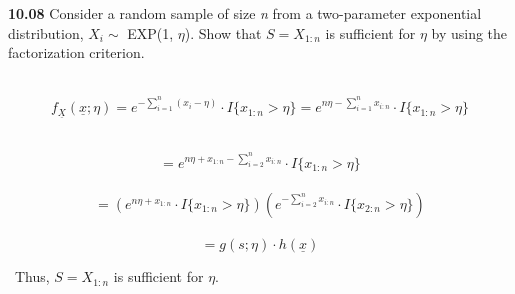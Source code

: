 { \bf 10.08 } Consider a random sample of size \textsl{n} from a two-parameter exponential distribution, $ X_{i} \sim $ EXP(1, $ \eta $).  Show that $ S = X_{1:n} $ is sufficient for $ \eta $ by using the factorization criterion.

\ $$ f_{\underline{X}}(\underline{x}; \eta) = e^{-\sum_{i=1}^{n}(x_{i}-\eta)} \cdot I \{x_{1:n} > \eta \} = e^{n\eta-\sum_{i=1}^{n}x_{i:n}} \cdot I \{x_{1:n} > \eta \} $$

\ $$ = e^{n\eta + x_{1:n}-\sum_{i=2}^{n}x_{i:n}} \cdot I \{x_{1:n} > \eta \} $$
\ $$ = \left(e^{n\eta + x_{1:n}} \cdot I \{x_{1:n} > \eta \} \right) \left(e^{-\sum_{i=2}^{n}x_{i:n}} \cdot I \{x_{2:n} > \eta \} \right) $$
\ $$ = g(s; \eta) \cdot h(\underline{x}) $$

\  Thus, $ S = X_{1:n} $ is sufficient for $ \eta $.